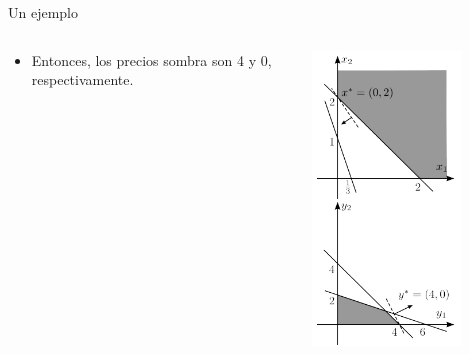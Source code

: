 \documentclass{beamer}
\begin{document}
\begin{frame}{Un ejemplo}
\begin{columns}
\begin{column}{0.6\textwidth}
{    \begin{itemize}
        \item Entonces, los precios sombra son 4 y 0, respectivamente.
    \end{itemize}}
\end{column}
\begin{column}{0.4\textwidth}
    \begin{center}
        \includegraphics[width=0.75\textwidth]{images/shadows5.png}
    \end{center}
\end{column}
\end{columns}
\end{frame}
\end{document}

